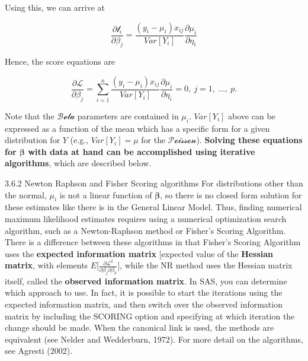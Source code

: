 \documentclass[
  9pt,
  ignorenonframetext,
]{beamer}
\begin{document}
\begin{frame}{}
\protect\hypertarget{section-4}{}
Using this, we can arrive at

\[
\frac {\partial \mathcal l_i} {\partial\beta_j }=\frac {(y_i-\mu_i)x_{ij}} {Var[Y_i]} \frac {\partial\mu_i} {\partial\eta_i}
\]

Hence, the score equations are

\[
\frac {\partial \mathcal L} {\partial\beta_j} = \sum_{i=1}^n \frac {(y_i-\mu_i)x_{ij}} { Var[Y_i]} \frac {\partial\mu_i} {\partial\eta_i} =0 ,\     j=1,\ ...,\ p .
\]

Note that the \(\mathcal {Beta}\) parameters are contained in \(\mu_i\).
\(Var[Y_i]\) above can be expressed as a function of the mean which has
a specific form for a given distribution for \(Y\) (e.g.,
\(Var[Y_i]=\mu\) for the \(\mathcal {Poisson}\)). \textbf{Solving these
equations for \(\pmb \beta\) with data at hand can be accomplished using
iterative algorithms}, which are described below.
\end{frame}

\begin{frame}{3.6.2 Newton Raphson and Fisher Scoring algorithms}
\protect\hypertarget{newton-raphson-and-fisher-scoring-algorithms}{}
For distributions other than the normal, \(\mu_i\) is not a linear
function of \(\pmb \beta\), so there is no closed form solution for
these estimates like there is in the General Linear Model. Thus, finding
numerical maximum likelihood estimates requires using a numerical
optimization search algorithm, such as a Newton-Raphson method or
Fisher's Scoring Algorithm. There is a difference between these
algorithms in that Fisher's Scoring Algorithm uses the \textbf{expected
information matrix} {[}expected value of the \textbf{Hessian matrix},
with elements
\(E \Big[\frac {\partial \mathcal L^2} {\partial\beta_j \partial\beta_k}\Big]\),
while the NR method uses the Hessian matrix itself, called the
\textbf{observed information matrix}. In SAS, you can determine which
approach to use. In fact, it is possible to start the iterations using
the expected information matrix, and then switch over the observed
information matrix by including the SCORING option and specifying at
which iteration the change should be made. When the canonical link is
used, the methods are equivalent (see Nelder and Wedderburn, 1972). For
more detail on the algorithms, see Agresti (2002).
\end{frame}
\end{document}

